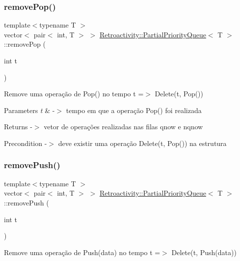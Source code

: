 \subsubsection{\texorpdfstring{remove\+Pop()}{removePop()}}
{\footnotesize\ttfamily template$<$typename T $>$ \\
vector$<$ pair$<$ int, T $>$ $>$ \hyperlink{classRetroactivity_1_1PartialPriorityQueue}{Retroactivity\+::\+Partial\+Priority\+Queue}$<$ T $>$\+::remove\+Pop (\begin{DoxyParamCaption}\item[{int}]{t }\end{DoxyParamCaption})}

Remove uma operação de Pop() no tempo t =$>$ Delete(t, Pop())


\begin{DoxyParams}{Parameters}
{\em t} & -\/$>$ tempo em que a operação Pop() foi realizada \\
\hline
\end{DoxyParams}
\begin{DoxyReturn}{Returns}
-\/$>$ vetor de operações realizadas nas filas qnow e nqnow 
\end{DoxyReturn}
\begin{DoxyPrecond}{Precondition}
-\/$>$ deve existir uma operação Delete(t, Pop()) na estrutura 
\end{DoxyPrecond}
\mbox{\label{classRetroactivity_1_1PartialPriorityQueue_aa999f060161fb3f1f87a6f31010df8af}} 
\subsubsection{\texorpdfstring{remove\+Push()}{removePush()}}
{\footnotesize\ttfamily template$<$typename T $>$ \\
vector$<$ pair$<$ int, T $>$ $>$ \hyperlink{classRetroactivity_1_1PartialPriorityQueue}{Retroactivity\+::\+Partial\+Priority\+Queue}$<$ T $>$\+::remove\+Push (\begin{DoxyParamCaption}\item[{int}]{t }\end{DoxyParamCaption})}

Remove uma operação de Push(data) no tempo t =$>$ Delete(t, Push(data))


